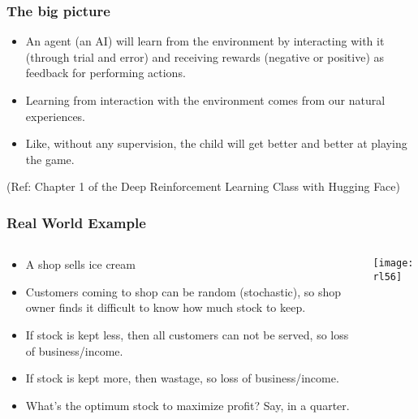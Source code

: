 \begin{frame}[fragile]\frametitle{The big picture}
\begin{itemize}
\item An agent (an AI) will learn from the environment by interacting with it (through trial and error) and receiving rewards (negative or positive) as feedback for performing actions.
\item Learning from interaction with the environment comes from our natural experiences.
\item Like, without any supervision, the child will get better and better at playing the game.
\end{itemize}

{\tiny (Ref: Chapter 1 of the Deep Reinforcement Learning Class with Hugging Face)}


\end{frame}

\begin{frame}[fragile]\frametitle{Real World Example}

\begin{columns}
\begin{column}{0.5\textwidth}

\begin{itemize}
\item A shop sells ice cream
\item Customers coming to shop can be random (stochastic), so shop owner finds it difficult to know how much stock to keep.
\item If stock is kept less, then all customers can not be served, so loss of business/income.
\item If stock is kept more, then wastage, so loss of business/income.
\item What's the optimum stock to maximize profit? Say, in a quarter.
\end{itemize}

\end{column}
\begin{column}{0.5\textwidth}  %


\begin{center}
\texttt{[image: rl56]}
\end{center}
\end{column}
\end{columns}

\end{frame}


